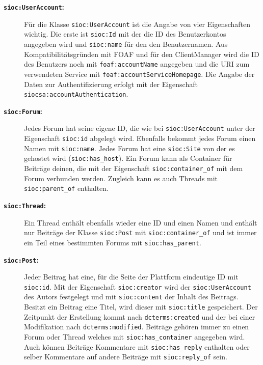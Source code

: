 \begin{description}
    \item[\textbf{\texttt{sioc:UserAccount}:}]  Für die Klasse \texttt{sioc:UserAccount} ist die Angabe von vier Eigenschaften wichtig. Die erste ist \texttt{sioc:Id} mit der die ID des Benutzerkontos angegeben wird und \texttt{sioc:name} für den den Benutzernamen. Aus Kompatibilitätsgründen mit FOAF und für den ClientManager wird die ID des Benutzers noch mit \texttt{foaf:accountName} angegeben und die URI zum verwendeten Service mit \texttt{foaf:accountServiceHomepage}. Die Angabe der Daten zur Authentifizierung erfolgt mit der Eigenschaft \texttt{siocsa:accountAuthentication}.

    \item[\textbf{\texttt{sioc:Forum}:}] Jedes Forum hat seine eigene ID, die wie bei \texttt{sioc:UserAccount} unter der Eigenschaft \texttt{sioc:id} abgelegt wird. Ebenfalls bekommt jedes Forum einen Namen mit \texttt{sioc:name}. Jedes Forum hat eine \texttt{sioc:Site} von der es gehostet wird (\texttt{sioc:has\_host}). Ein Forum kann als Container für Beiträge deinen, die mit der Eigenschaft \texttt{sioc:container\_of} mit dem Forum verbunden werden. Zugleich kann es auch Threads mit \texttt{sioc:parent\_of} enthalten. 

    \item[\textbf{\texttt{sioc:Thread}:}] Ein Thread enthält ebenfalls wieder eine ID und einen Namen und enthält nur Beiträge der Klasse \texttt{sioc:Post} mit \texttt{sioc:container\_of} und ist immer ein Teil eines bestimmten Forums mit \texttt{sioc:has\_parent}.

    \item[\textbf{\texttt{sioc:Post}:}] Jeder Beitrag hat eine, für die Seite der Plattform eindeutige ID mit \texttt{sioc:id}. Mit der Eigenschaft \texttt{sioc:creator} wird der \texttt{sioc:UserAccount} des Autors festgelegt und mit \texttt{sioc:content} der Inhalt des Beitrags. Besitzt ein Beitrag eine Titel, wird dieser mit \texttt{sioc:title} gespeichert. Der Zeitpunkt der Erstellung kommt nach \texttt{dcterms:created} und der bei einer Modifikation nach \texttt{dcterms:modified}. Beiträge gehören immer zu einen Forum oder Thread welches mit \texttt{sioc:has\_container} angegeben wird. Auch können Beiträge Kommentare mit \texttt{sioc:has\_reply} enthalten oder selber Kommentare auf andere Beiträge mit \texttt{sioc:reply\_of} sein.
\end{description}

